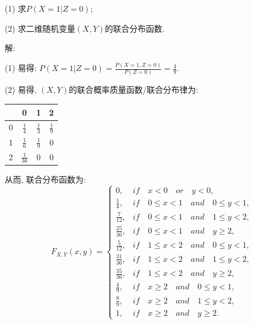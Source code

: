 \documentclass[standard]{ExBook}
\begin{document}
\begin{qitems}
\begin{bbox}
\begin{shaded}
(1) 求$P(X = 1 | Z = 0)$;

(2) 求二维随机变量$(X,Y)$的联合分布函数.
    \end{shaded}
    \end{bbox}

\vspace{-5em}

    \begin{bbox}
解: 

(1) 易得: $P(X=1|Z=0)=\frac{P(X=1,Z=0)}{P(Z=0)}=\frac{4}{9}$.
    \end{bbox}

\vspace{-5em}

    \begin{bbox}
(2) 易得, $(X,Y)$的联合概率质量函数/联合分布律为:
\begin{footnotesize}
\begin{center}
    \renewcommand{\arraystretch}{1.5}
    \setlength{\tabcolsep}{20pt}
    \begin{tabular}{c|c|c|c}
	    \hline
	    \diagbox{$X$}{$P(X,Y)$}{$Y$} & 0 & 1 & 2 \\
	    \hline
	    0 & $\displaystyle\frac{1}{4}$ & $\displaystyle\frac{1}{3}$ & $\displaystyle\frac{1}{9}$\\
	    \hline
	    1 & $\displaystyle\frac{1}{6}$ & $\displaystyle\frac{1}{9}$ & 0\\
	    \hline
        2 & $\displaystyle\frac{1}{36}$ & 0 & 0 \\
        \hline
    \end{tabular}
\end{center}
\end{footnotesize}
从而, 联合分布函数为:
\[
F_{X,Y}(x, y) = 
\begin{cases} 
0, & if\quad x < 0\quad or\quad y < 0, \\
\frac{1}{4}, & if\quad 0 \leq x < 1\quad and\quad 0 \leq y < 1, \\
\frac{7}{12}, & if\quad 0 \leq x < 1\quad and\quad 1 \leq y < 2, \\
\frac{25}{36}, & if\quad 0 \leq x < 1\quad and\quad y \geq 2, \\
\frac{5}{12}, & if\quad 1 \leq x < 2\quad and\quad 0 \leq y < 1, \\
\frac{31}{36}, & if\quad 1 \leq x < 2\quad and\quad 1 \leq y < 2, \\
\frac{35}{36}, & if\quad 1 \leq x < 2\quad and\quad y \geq 2, \\
\frac{4}{9}, & if\quad x \geq 2\quad and\quad 0 \leq y < 1, \\
\frac{8}{9}, & if\quad x \geq 2\quad and\quad 1 \leq y < 2, \\
1, & if\quad x \geq 2\quad and\quad y \geq 2.
\end{cases}
\]
    \end{bbox}


\end{qitems}
\end{document}
